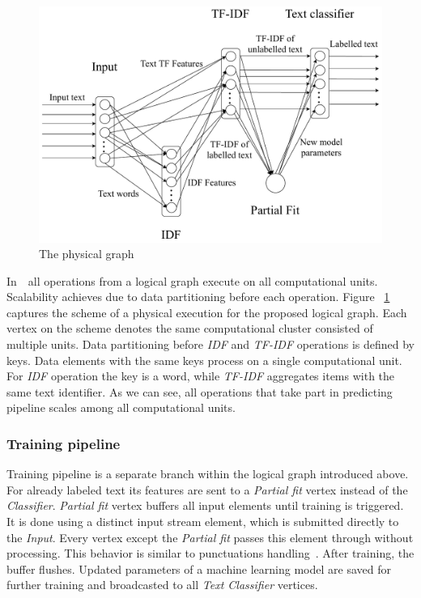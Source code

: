 \begin{figure}[htbp]
  \centering
  \includegraphics[scale=0.375]{pics/physical-graph}
  \caption{The physical graph}
  \label {physical_graph}
\end{figure}

In~\FlameStream\, all operations from a logical graph execute on all computational units. Scalability achieves due to data partitioning before each operation. Figure ~\ref{physical_graph} captures the scheme of a physical execution for the proposed logical graph. Each vertex on the scheme denotes the same computational cluster consisted of multiple units. Data partitioning before {\em IDF} and {\em TF-IDF} operations is defined by keys. Data elements with the same keys process on a single computational unit. For {\em IDF} operation the key is a word, while {\em TF-IDF} aggregates items with the same text identifier. As we can see, all operations that take part in predicting pipeline scales among all computational units. 

\subsubsection{Training pipeline}

Training pipeline is a separate branch within the logical graph introduced above. For already labeled text its features are sent to a {\em Partial fit} vertex instead of the {\em Classifier}. {\em Partial fit} vertex buffers all input elements until training is triggered. It is done using a distinct input stream element, which is submitted directly to the {\em Input}. Every vertex except the {\em Partial fit} passes this element through without processing. This behavior is similar to punctuations handling~\cite{tucker2003exploiting}. After training, the buffer flushes. Updated parameters of a machine learning model are saved for further training and broadcasted to all {\em Text Classifier} vertices.

